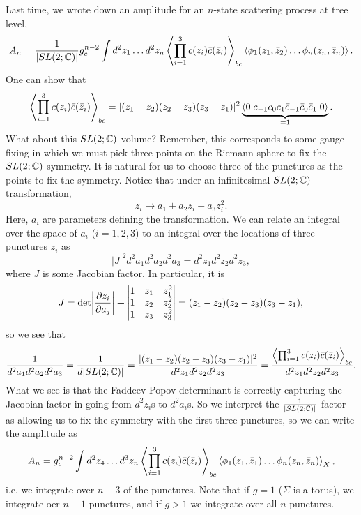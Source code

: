 Last time, we wrote down an amplitude for an $n$-state scattering process at tree level,
\begin{equation}
    A_n =\frac{1}{\lvert SL(2;\mathbb{C})\rvert}g_c^{n-2} \int d^2 z_1 \ldots d^2 z_n \left< \prod_{i=1}^3 c(z_i) \bar c(\bar z_i) \right>_{bc} \left< \phi_1(z_1,\bar z_2)\ldots \phi_n(z_n,\bar z_n) \right>.
\end{equation}
One can show that
\begin{equation}
    \left< \prod_{i=1}^3 c(z_i) \bar c(\bar z_i) \right>_{bc} =\lvert(z_1-z_2)(z_2-z_3)(z_3-z_1)\rvert^2 \underbrace{\langle0\rvert c_{-1} c_0 c_1 \bar c_{-1} \bar c_0\bar c_1 \lvert0\rangle}_{=1}.
\end{equation}
What about this $SL(2;\mathbb{C})$ volume? Remember, this corresponds to some gauge fixing in which we must pick three points on the Riemann sphere to fix the $SL(2;\mathbb{C})$ symmetry. It is natural for us to choose three of the punctures as the points to fix the symmetry. Notice that under an infinitesimal $SL(2;\mathbb{C})$ transformation,
\begin{equation}
    z_i\to a_1 + a_2 z_i + a_3 z_i^2.
\end{equation}
Here, $a_i$ are parameters defining the transformation. We can relate an integral over the space of $a_i$ ($i=1,2,3$) to an integral over the locations of three punctures $z_i$ as
\begin{equation}
    |J|^2 d^2 a_1 d^2 a_2 d^2 a_3= d^2 z_1 d^2z_2 d^2z_3,
\end{equation}
where $J$ is some Jacobian factor. In particular, it is
\begin{equation}
    J=\det\abs*{\P{z_i}{a_j}} + \abs*{\begin{matrix}
    1 & z_1 & z_1^2\\
    1 & z_2 & z_2^2\\
    1 & z_3 & z_3^2
    \end{matrix}}
    =(z_1-z_2)(z_2-z_3)(z_3-z_1),
\end{equation}
so we see that
\begin{equation}
    \frac{1}{d^2a_1 d^2 a_2 d^2a_3}=\frac{1}{d|SL(2;\mathbb{C})|}=\frac{|(z_1-z_2)(z_2-z_3)(z_3-z_1)|^2}{d^2 z_1 d^2 z_2 d^2 z_3}=\frac{\left< \prod_{i=1}^3 c(z_i) \bar c(\bar z_i) \right>_{bc}}{d^2 z_1 d^2 z_2 d^2z_3}.
\end{equation}
What we see is that the Faddeev-Popov determinant is correctly capturing the Jacobian factor in going from $d^2z_i$s to $d^2 a_i$s. So we interpret the $\frac{1}{|SL(2;\mathbb{C})|}$ factor as allowing us to fix the symmetry with the first three punctures, so we can write the amplitude as
\begin{equation}
    A_n=g_c^{n-2} \int d^2 z_4 \ldots d^3 z_n \left< \prod_{i=1}^3 c(z_i) \bar c(\bar z_i) \right>_{bc} \left< \phi_1(z_1,\bar z_1) \ldots \phi_n(z_n,\bar z_n) \right>_X,
\end{equation}
i.e. we integrate over $n-3$ of the punctures. Note that if $g=1$ ($\Sigma$ is a torus), we integrate oer $n-1$ punctures, and if $g>1$ we integrate over all $n$ punctures.

